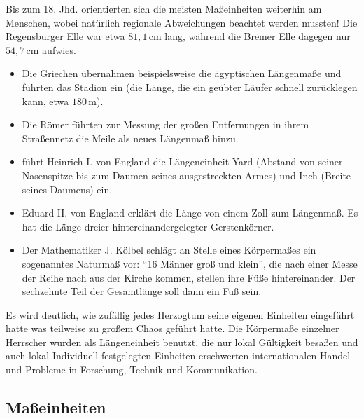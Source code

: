 \documentclass[letterpaper,10pt,english]{jupyterBook}
\begin{document}
\sphinxAtStartPar
Bis zum 18. Jhd.  orientierten sich die meisten Maßeinheiten weiterhin am Menschen, wobei natürlich regionale Abweichungen beachtet werden mussten! Die Regensburger Elle war etwa \(81,1\,\mathrm{cm}\) lang, während die Bremer Elle dagegen nur \(54,7\,\mathrm{cm}\) aufwies.
\begin{itemize}
\item {} 
\sphinxAtStartPar
Die Griechen übernahmen beispielsweise die ägyptischen Längenmaße und führten das Stadion ein (die Länge, die ein geübter Läufer schnell zurücklegen kann, etwa \(180\,\mathrm m\)).

\item {} 
\sphinxAtStartPar
Die Römer führten zur Messung der großen Entfernungen in ihrem Straßennetz die Meile als neues Längenmaß hinzu.

\item {} 
 führt Heinrich I. von England die Längeneinheit Yard (Abstand von seiner Nasenspitze bis zum Daumen seines ausgestreckten Armes) und Inch (Breite seines Daumens) ein.

\item {} 
\sphinxAtStartPar
Eduard II. von England erklärt die Länge von einem Zoll zum Längenmaß. Es hat die Länge dreier hintereinandergelegter Gerstenkörner.

\item {} 
\sphinxAtStartPar
Der Mathematiker J. Kölbel schlägt an Stelle eines Körpermaßes ein sogenanntes Naturmaß vor: “16 Männer groß und klein”, die nach einer Messe der Reihe nach aus der Kirche kommen, stellen ihre Füße hintereinander. Der sechzehnte Teil der Gesamtlänge soll dann ein Fuß sein.

\end{itemize}

\sphinxAtStartPar
Es wird deutlich, wie zufällig jedes Herzogtum seine eigenen Einheiten eingeführt hatte was teilweise zu großem Chaos geführt hatte.
Die Körpermaße einzelner Herrscher wurden als Längeneinheit benutzt, die nur lokal Gültigkeit besaßen und auch lokal Individuell festgelegten Einheiten erschwerten internationalen Handel und Probleme in Forschung, Technik und Kommunikation.


\subsection{Maßeinheiten}
\label{\detokenize{content/0_Basics:maszeinheiten}}
\sphinxAtStartPar
\end{document}
